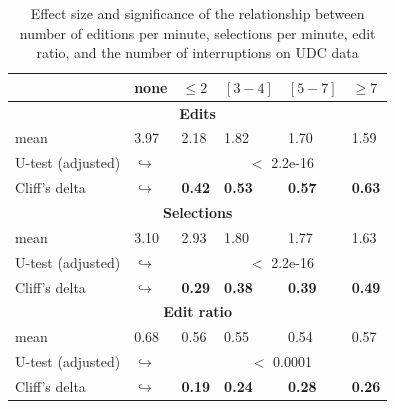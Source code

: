 \documentclass[times]{smrauth}
\begin{document}
\begin{table}[ht!]
	\tiny
	\renewcommand{\arraystretch}{1.3}
	\caption{Effect size and significance of the relationship between number of editions per minute, selections per minute, edit ratio, and the number of interruptions on UDC data} 
	\label{tbl:p_value_udc}
	\centering
	\begin{tabular}{l | p{0.75cm} | p{1.2cm} | p{1.2cm} | p{1.2cm} |p{1.2cm}} 
		
		& none & $\leq 2$ & $[3 - 4]$ & $[5 - 7]$ & $\geq 7$  \\  
		\hline
		\multicolumn{6}{c}{\textbf{Edits}} \\
		\hline
		mean & 3.97 &	2.18 & 1.82 & 1.70 & 1.59 \\ 
		\cline{3-6} 
		U-test (adjusted) & $\hookrightarrow$ & \multicolumn{4}{c}{$<$ 2.2e-16} \\
		\cline{3-6} 
		Cliff's delta & $\hookrightarrow$	& \textbf{0.42} & \textbf{0.53} & \textbf{0.57} & \textbf{0.63}    \\
		
		
		\hline
		\multicolumn{6}{c}{\textbf{Selections}} \\
		\hline 
		mean & 3.10 &	2.93 & 1.80 & 1.77 & 1.63  \\ 
		\cline{3-6} 
		U-test (adjusted)& $\hookrightarrow$ & \multicolumn{4}{c}{$<$ 2.2e-16} \\
		\cline{3-6} 
		Cliff's delta & $\hookrightarrow$	& \textbf{0.29} & \textbf{0.38} & \textbf{0.39} & \textbf{0.49} \\  
		\hline
		
		\multicolumn{6}{c}{\textbf{Edit ratio}} \\
		\hline 
		mean & 0.68 & 0.56 & 0.55 & 0.54 & 0.57 \\ 
		\cline{3-6} 
		\cline{3-6} 
		U-test (adjusted) &  $\hookrightarrow$& \multicolumn{4}{c}{$<$ 0.0001} \\
		\cline{3-6} 
		Cliff's delta & $\hookrightarrow$ & \textbf{0.19} & \textbf{0.24} & \textbf{0.28} & \textbf{0.26} \\ 
		\hline
		
		
	\end{tabular}
\end{table}
\end{document}
